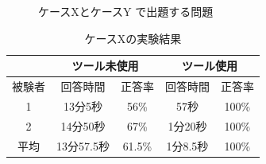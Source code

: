 \begin{figure}[t]
	\centering
	\caption{ケースXとケースY で出題する問題}
	\label{fig:mondai}
\end{figure}

\begin{table}[tp]
  \begin{center}
    \caption{ケースXの実験結果}
    \label{resultX}
    \begin{tabular}{c|c|c|c|c|}
    \cline{2-5}
                              & \multicolumn{2}{c|}{ツール未使用} & \multicolumn{2}{c|}{ツール使用} \\ \hline
    \multicolumn{1}{|c||}{被験者} & 回答時間           & 正答率          & 回答時間           & 正答率         \\ \hline\hline
    \multicolumn{1}{|c||}{1}   & 13分5秒           & 56\%         & 57秒           & 100\%         \\ \hline
    \multicolumn{1}{|c||}{2}   & 14分50秒          & 67\%          & 1分20秒          & 100\%         \\ \hline\hline
    \multicolumn{1}{|c||}{平均}   & 13分57.5秒          & 61.5\%          & 1分8.5秒          & 100\%         \\ \hline
    \end{tabular}
  \end{center}
\end{table}

